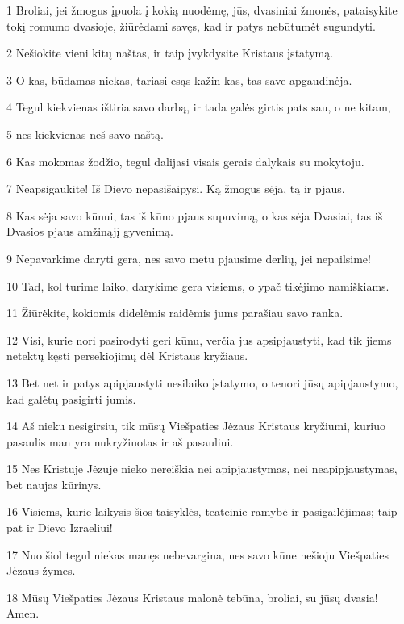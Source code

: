 \par 1 Broliai, jei žmogus įpuola į kokią nuodėmę, jūs, dvasiniai žmonės, pataisykite tokį romumo dvasioje, žiūrėdami savęs, kad ir patys nebūtumėt sugundyti. 
\par 2 Nešiokite vieni kitų naštas, ir taip įvykdysite Kristaus įstatymą. 
\par 3 O kas, būdamas niekas, tariasi esąs kažin kas, tas save apgaudinėja. 
\par 4 Tegul kiekvienas ištiria savo darbą, ir tada galės girtis pats sau, o ne kitam, 
\par 5 nes kiekvienas neš savo naštą. 
\par 6 Kas mokomas žodžio, tegul dalijasi visais gerais dalykais su mokytoju. 
\par 7 Neapsigaukite! Iš Dievo nepasišaipysi. Ką žmogus sėja, tą ir pjaus. 
\par 8 Kas sėja savo kūnui, tas iš kūno pjaus supuvimą, o kas sėja Dvasiai, tas iš Dvasios pjaus amžinąjį gyvenimą. 
\par 9 Nepavarkime daryti gera, nes savo metu pjausime derlių, jei nepailsime! 
\par 10 Tad, kol turime laiko, darykime gera visiems, o ypač tikėjimo namiškiams. 
\par 11 Žiūrėkite, kokiomis didelėmis raidėmis jums parašiau savo ranka. 
\par 12 Visi, kurie nori pasirodyti geri kūnu, verčia jus apsipjaustyti, kad tik jiems netektų kęsti persekiojimų dėl Kristaus kryžiaus. 
\par 13 Bet net ir patys apipjaustyti nesilaiko įstatymo, o tenori jūsų apipjaustymo, kad galėtų pasigirti jumis. 
\par 14 Aš nieku nesigirsiu, tik mūsų Viešpaties Jėzaus Kristaus kryžiumi, kuriuo pasaulis man yra nukryžiuotas ir aš pasauliui. 
\par 15 Nes Kristuje Jėzuje nieko nereiškia nei apipjaustymas, nei neapipjaustymas, bet naujas kūrinys. 
\par 16 Visiems, kurie laikysis šios taisyklės, teateinie ramybė ir pasigailėjimas; taip pat ir Dievo Izraeliui! 
\par 17 Nuo šiol tegul niekas manęs nebevargina, nes savo kūne nešioju Viešpaties Jėzaus žymes. 
\par 18 Mūsų Viešpaties Jėzaus Kristaus malonė tebūna, broliai, su jūsų dvasia! Amen.


